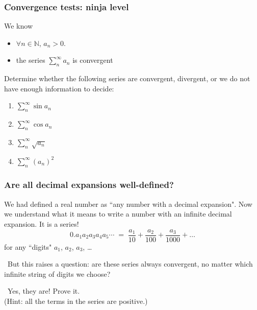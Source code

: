 \documentclass[14pt]{beamer}
\newcommand{\N}{\mathbb{N}}
\newcommand{\setsize}[1]{\fontsize{#1}{#1}\selectfont} %
\newcommand{\smallerfont}{\setsize{13}} %
\begin{document}
	\begin{frame}[t]
		\frametitle{Convergence tests: ninja level}

		We know
		\begin{itemize}
			\item ${\displaystyle \forall n \in \N}$, ${\displaystyle a_n > 0}$.

			\item the series ${\displaystyle \sum_n^{\infty} a_n }$ is convergent
		\end{itemize}

		Determine whether the following series are convergent, divergent, or we do not
		have enough information to decide:
		\begin{multicols}{2}
			\begin{enumerate}
				\item ${\displaystyle \sum_n^{\infty} \sin a_n}$

				\item ${\displaystyle \sum_n^{\infty} \cos a_n}$

				\item ${\displaystyle \sum_n^{\infty} \sqrt{a_{n}}}$

				\item ${\displaystyle \sum_n^{\infty} \left( a_n \right)^2}$
			\end{enumerate}
		\end{multicols}
	\end{frame}
	\begin{frame}[t]
		\smallerfont
		\frametitle{Are all decimal expansions well-defined?}

		We had defined a real number as ``any number with a decimal expansion". Now
		we understand what it means to write a number with an infinite decimal
		expansion. It is a series!
		\[
			0.a_{1}a_{2}a_{3}a_{4}a_{5}\cdots \; = \; \frac{a_{1}}{10}+ \frac{a_{2}}{100}
			+ \frac{a_{3}}{1000}+ \ldots
		\]
		for any ``digits" $a_{1}$, $a_{2}$, $a_{3}$, \ldots

		\
 But this raises a question: are these series always convergent, no matter which
		infinite string of digits we choose?

		\
 Yes, they are! Prove it. \\ (Hint: all the terms in the series are
		positive.)
	\end{frame}
\end{document}
